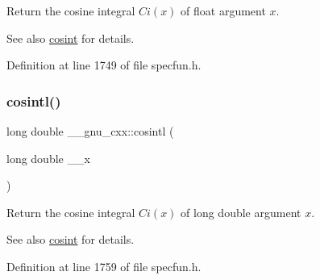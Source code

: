 Return the cosine integral $ Ci(x) $ of {\ttfamily float} argument $ x $.

\begin{DoxySeeAlso}{See also}
\hyperlink{group__gnu__math__spec__func_gafd398869cde057087e6b3428a1d13a93}{cosint} for details. 
\end{DoxySeeAlso}


Definition at line 1749 of file specfun.\+h.

\mbox{\label{group__gnu__math__spec__func_ga5f01f17ae8859129860118b09d51791c}} 
\subsubsection{\texorpdfstring{cosintl()}{cosintl()}}
{\footnotesize\ttfamily long double \+\_\+\+\_\+gnu\+\_\+cxx\+::cosintl (\begin{DoxyParamCaption}\item[{long double}]{\+\_\+\+\_\+x }\end{DoxyParamCaption})\hspace{0.3cm}{\ttfamily [inline]}}

Return the cosine integral $ Ci(x) $ of {\ttfamily long double} argument $ x $.

\begin{DoxySeeAlso}{See also}
\hyperlink{group__gnu__math__spec__func_gafd398869cde057087e6b3428a1d13a93}{cosint} for details. 
\end{DoxySeeAlso}


Definition at line 1759 of file specfun.\+h.

\mbox{\label{group__gnu__math__spec__func_ga5329bba77d10a9d2f15d9bbe43a70db3}} 
